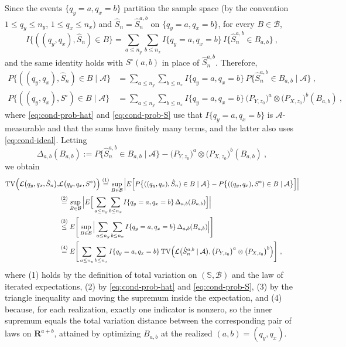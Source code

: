 \documentclass[11pt]{article}
\numberwithin{equation}{section}
\begin{document}
\medskip
{} Since the events $\{q_y=a,q_x=b\}$ partition the sample space (by the
convention $1\le q_y\le n_y$, $1\le q_x\le n_x$) and $\hat S_n=\hat S_n^{a,b}$ on $\{q_y=a,q_x=b\}$, for
every $B\in\mathcal B$,
\begin{equation*}
 I\{((q_y,q_x),\hat S_n)\in B\}
 =\sum_{a\le n_y}\sum_{b\le n_x} I\{q_y=a,q_x=b\}\,I\{\hat S_n^{a,b}\in B_{a,b}\}~,
\end{equation*}
and the same identity holds with $S^{\circ}(a,b)$ in place of $\hat S_n^{a,b}$. Therefore,
\begin{align}
 P\{((q_y,q_x),\hat S_n)\in B\mid\mathcal A\}
 &=\sum_{a\le n_y}\sum_{b\le n_x} I\{q_y=a,q_x=b\}\,
 P\{\hat S_n^{a,b}\in B_{a,b}\mid\mathcal A\}~,\label{eq:cond-prob-hat}\\
 P\{((q_y,q_x),S^{\circ})\in B\mid\mathcal A\}
 &=\sum_{a\le n_y}\sum_{b\le n_x} I\{q_y=a,q_x=b\}\,
 \big(P_{Y,z_0}\big)^{a}\otimes\big(P_{X,z_0}\big)^{b}(B_{a,b})~,\label{eq:cond-prob-S}
\end{align}
where \eqref{eq:cond-prob-hat} and \eqref{eq:cond-prob-S} use that $I\{q_y=a,q_x=b\}$ is $\mathcal A$-measurable and that the sums have finitely many terms, and the latter also uses \eqref{eq:cond-ideal}. Letting
\begin{equation*}
 \Delta_{a,b}(B_{a,b}):=P\big\{\hat S_n^{a,b}\in B_{a,b}\mid\mathcal A\big\}
 -\big(P_{Y,z_0}\big)^{a}\otimes\big(P_{X,z_0}\big)^{b}(B_{a,b})~,
\end{equation*}
we obtain
\begin{align}
 \mathrm{TV}\Big(\mathcal L\big(q_y,q_x,\hat S_n\big),&\mathcal L\big(q_y,q_x,S^{\circ}\big)\Big)
 \overset{(1)}{=}\sup_{B\in\mathcal B}\Big\vert
 E\Big[P\big\{((q_y,q_x),\hat S_n)\in B\mid\mathcal A\big\}
 -P\big\{((q_y,q_x),S^{\circ})\in B\mid\mathcal A\big\}\Big]\Big\vert\notag\\
 &\overset{(2)}{=}\sup_{B\in\mathcal B}\Big\vert
 E\Big[\sum_{a\le n_y}\sum_{b\le n_x}I\{q_y=a,q_x=b\}\,
 \Delta_{a,b}(B_{a,b})\Big]\Big\vert\notag\\
 &\overset{(3)}{\le}
 E\Bigg[\sup_{B\in\mathcal B}\Big\vert\sum_{a\le n_y}\sum_{b\le n_x}I\{q_y=a,q_x=b\}\,
 \Delta_{a,b}(B_{a,b})\Big\vert\Bigg]\notag\\
 &\overset{(4)}{=}
 E\Bigg[\sum_{a\le n_y}\sum_{b\le n_x}I\{q_y=a,q_x=b\}\,
 \mathrm{TV}\Big(\mathcal L\big(\hat S_n^{a,b}\mid\mathcal A\big),
 \big(P_{Y,z_0}\big)^{a}\otimes\big(P_{X,z_0}\big)^{b}\Big)\Bigg]~,
 \label{eq:decondition}
\end{align}
where (1) holds by the definition of total variation on $(\mathbb S,\mathcal B)$ and the law of iterated expectations, (2) by \eqref{eq:cond-prob-hat} and \eqref{eq:cond-prob-S}, (3) by the triangle inequality and moving the supremum inside the expectation, and (4) because, for each realization, exactly one indicator is nonzero, so the inner supremum equals the total variation distance between the corresponding pair of laws on $\mathbf R^{a+b}$, attained by optimizing $B_{a,b}$ at the realized $(a,b)=(q_y,q_x)$.
\end{document}
